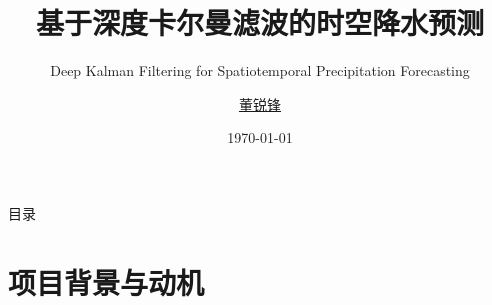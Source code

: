 \documentclass[10pt,aspectratio=1610]{beamer}
\title{基于深度卡尔曼滤波的时空降水预测}
\subtitle{Deep Kalman Filtering for Spatiotemporal Precipitation Forecasting}
\author{
    \href{mailto:dongruifeng25@mails.ucas.ac.cn}{董锐锋}
}
\institute{Institute of Optics and Electronics, Chinese Academy of Sciences }
\date{\today}
\begin{document}
\maketitle

\begin{frame}{目录}
    \tableofcontents
\end{frame}

\section{项目背景与动机}
\end{document}
